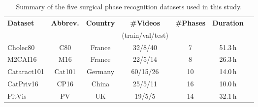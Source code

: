 \begin{table}[t]
\centering
\caption{Summary of the five surgical phase recognition datasets used in this study.}
\label{tab:datasets}
\setlength{\tabcolsep}{4pt}
\footnotesize
\begin{tabular}{lcccccc}
\toprule
\textbf{Dataset} & \textbf{Abbrev.} & \textbf{Country} & \textbf{\#Videos} & \textbf{\#Phases} & \textbf{Duration} \\
 & & & (train/val/test) & & \\
\midrule
Cholec80 & C80 & France & 32/8/40 & 7 & 51.3\,h \\
M2CAI16 & M16 & France & 22/5/14 & 8 & 26.3\,h \\
Cataract101 & Cat101 & Germany & 60/15/26 & 10 & 14.0\,h \\
CatPriv16 & CP16 & China & 25/5/11 & 16 & 10.0\,h \\
PitVis & PV & UK & 19/5/5 & 14 & 32.1\,h \\
\bottomrule
\end{tabular}
\end{table}
